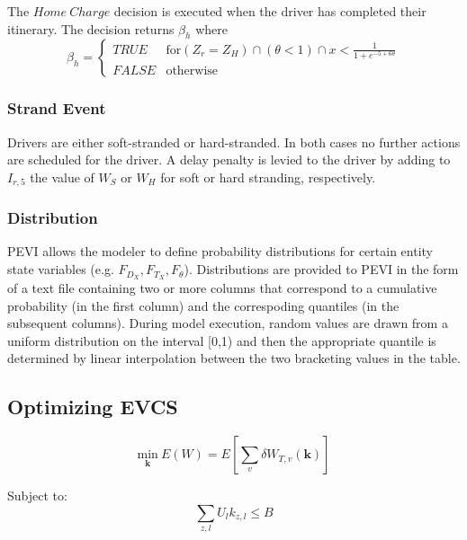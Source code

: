 \documentclass[journal]{IEEEtran}
\begin{document}
The $Home ~Charge$ decision is executed when the driver has completed their itinerary. The decision returns $\beta_h$ where 
\begin{equation}
  \beta_h = \begin{cases}
    TRUE & \text{for} (Z_r = Z_H) \cap (\theta < 1) \cap x < \frac{1}{1+e^{-5+6\theta}} \\
    FALSE & \text{otherwise}
  \end{cases}
\end{equation}
  
\subsubsection{Strand Event}\label{strandEv}

Drivers are either soft-stranded or hard-stranded.  In both cases no further actions are scheduled for the driver.  A delay penalty is levied to the driver by adding to $I_{r,5}$ the value of $W_S$ or $W_H$ for soft or hard stranding, respectively. 

\subsubsection{Distribution}\label{distSub}

PEVI allows the modeler to define probability distributions for certain entity state variables (e.g. $F_{D_X}, F_{T_X}, F_{\theta}$).  Distributions are provided to PEVI in the form of a text file containing two or more columns that correspond to a cumulative probability (in the first column) and the correspoding quantiles (in the subsequent columns).  During model execution, random values are drawn from a uniform distribution on the interval [0,1) and then the appropriate quantile is determined by linear interpolation between the two bracketing values in the table.

\subsection{Optimizing EVCS}\label{distSub}

\begin{equation}
  \underset{\mathbf{k}}{\text{min}} ~ E(W) = E\left[ \sum_v \delta W_{T,v}(\mathbf{k}) \right]
\end{equation}

Subject to:
\begin{equation}
\sum_{z,l} U_{l} k_{z,l} \le B 
\end{equation}
\end{document}
